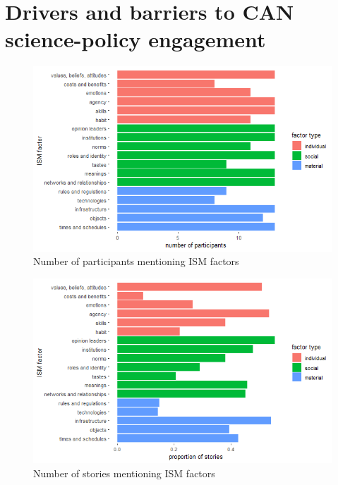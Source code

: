 \section{Drivers and barriers to CAN science-policy engagement}\label{sec:resultsISM}

\begin{figure}[!ht]
    \centering
    \includegraphics[width=1\linewidth]{figures/participants_mentioning_ism_factor.png}
    \caption{Number of participants mentioning ISM factors}
    \label{fig:ismparticipantcount}
\end{figure}

\begin{figure}[!ht]
    \centering
    \includegraphics[width=1\linewidth]{figures/stories_mentioning_ism_factor.png}
    \caption{Number of stories mentioning ISM factors}
    \label{fig:ismstorycount}
\end{figure}

